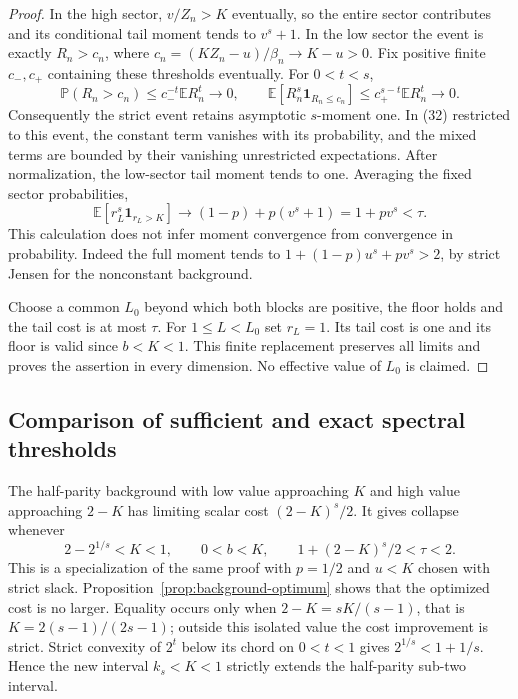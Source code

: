 \documentclass[11pt]{article}
\begin{document}
\begin{proof}
In the high sector, $v/Z_n>K$ eventually, so the entire sector
contributes and its conditional tail moment tends to $v^s+1$.
In the low sector the event is exactly $R_n>c_n$, where
$c_n=(KZ_n-u)/\beta_n\to K-u>0$. Fix positive finite
$c_-,c_+$ containing these thresholds eventually. For $0<t<s$,
\[
 \mathbb P(R_n>c_n)\le c_-^{-t}\mathbb ER_n^t\to0,
 \qquad
 \mathbb E[R_n^s\mathbf1_{R_n\le c_n}]
 \le c_+^{s-t}\mathbb ER_n^t\to0.
\]
Consequently the strict event retains asymptotic $s$-moment one.
In (32) restricted to this event, the constant term vanishes with
its probability, and the mixed terms are bounded by their vanishing
unrestricted expectations. After normalization, the low-sector
tail moment tends to one. Averaging the fixed sector probabilities,
\[
 \mathbb E[r_L^s\mathbf1_{r_L>K}]
 \longrightarrow (1-p)+p(v^s+1)=1+pv^s<\tau.
\]
This calculation does not infer moment convergence from convergence
in probability. Indeed the full moment tends to
$1+(1-p)u^s+pv^s>2$, by strict Jensen for the nonconstant background.

Choose a common $L_0$ beyond which both blocks are positive, the
floor holds and the tail cost is at most $\tau$. For $1\le L<L_0$
set $r_L=1$. Its tail cost is one and its floor is valid since
$b<K<1$. This finite replacement preserves all limits and proves
the assertion in every dimension. No effective value of $L_0$ is claimed.
\end{proof}

\subsection*{Comparison of sufficient and exact spectral thresholds}
The half-parity background with low value approaching $K$ and high
value approaching $2-K$ has limiting scalar cost $(2-K)^s/2$.
It gives collapse whenever
\[
 2-2^{1/s}<K<1,\qquad 0<b<K,\qquad
 1+(2-K)^s/2<\tau<2.
\]
This is a specialization of the same proof with $p=1/2$ and
$u<K$ chosen with strict slack. Proposition~\ref{prop:background-optimum}
shows that the optimized cost is no larger. Equality occurs only
when $2-K=sK/(s-1)$, that is $K=2(s-1)/(2s-1)$; outside this
isolated value the cost improvement is strict. Strict convexity
of $2^t$ below its chord on $0<t<1$ gives
$2^{1/s}<1+1/s$. Hence the new interval $k_s<K<1$ strictly
extends the half-parity sub-two interval.
\end{document}
